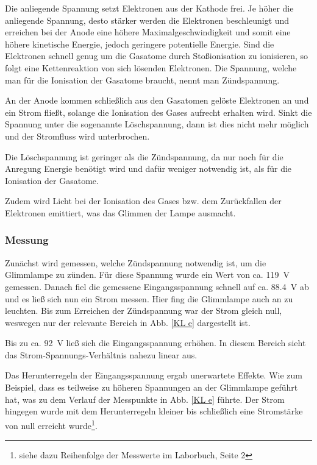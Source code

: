 \documentclass[11pt,a4paper,titlepage, ngerman]{article}
\begin{document}
				Die anliegende Spannung setzt Elektronen aus der Kathode frei.
				Je höher die anliegende Spannung, desto stärker werden die Elektronen beschleunigt und erreichen bei der Anode eine höhere Maximalgeschwindigkeit und somit eine höhere kinetische Energie, jedoch geringere potentielle Energie.
				Sind die Elektronen schnell genug um die Gasatome durch Stoßionisation zu ionisieren, so folgt eine Kettenreaktion von sich lösenden Elektronen.
				Die Spannung, welche man für die Ionisation der Gasatome braucht, nennt man Zündspannung. 
				
				An der Anode kommen schließlich aus den Gasatomen gelöste Elektronen an und ein Strom fließt, solange die Ionisation des Gases aufrecht erhalten wird.
				Sinkt die Spannung unter die sogenannte Löschspannung, dann ist dies nicht mehr möglich und der Stromfluss wird unterbrochen.

				Die Löschspannung ist geringer als die Zündspannung, da nur noch für die Anregung Energie benötigt wird und dafür weniger notwendig ist, als für die Ionisation der Gasatome.
					
				Zudem wird Licht bei der Ionisation des Gases bzw. dem Zurückfallen der Elektronen emittiert, was das \glqq Glimmen\grqq{} der Lampe ausmacht.
				
			\subsubsection*{Messung}
			
				Zunächst wird gemessen, welche Zündspannung notwendig ist, um die Glimmlampe zu zünden.
				Für diese Spannung wurde ein Wert von ca. \SI{119}{\V} gemessen.
				Danach fiel die gemessene Eingangsspannung schnell auf ca. \SI{88,4}{\V} ab und es ließ sich nun ein Strom messen.
				Hier fing die Glimmlampe auch an zu leuchten.
				Bis zum Erreichen der Zündspannung war der Strom gleich null, weswegen nur der relevante Bereich in Abb. \ref{KL e} dargestellt ist.
				
				Bis zu ca. \SI{92}{\V} ließ sich die Eingangsspannung erhöhen. In diesem Bereich sieht das Strom-Spannungs-Verhältnis nahezu linear aus.
				
				Das Herunterregeln der Eingangsspannung ergab unerwartete Effekte. Wie zum Beispiel, dass es teilweise zu höheren Spannungen an der Glimmlampe geführt hat, was zu dem Verlauf der Messpunkte in Abb. \ref{KL e} führte.				
				Der Strom hingegen wurde mit dem Herunterregeln kleiner bis schließlich eine Stromstärke von null erreicht wurde\footnote{siehe dazu Reihenfolge der Messwerte im Laborbuch, Seite 2}.
\end{document}
